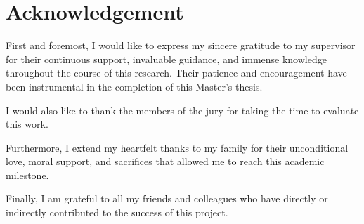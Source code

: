 \chapter*{Acknowledgement}
\vspace*{1cm}

First and foremost, I would like to express my sincere gratitude to my supervisor for their continuous support, invaluable guidance, and immense knowledge throughout the course of this research. Their patience and encouragement have been instrumental in the completion of this Master's thesis.

I would also like to thank the members of the jury for taking the time to evaluate this work.

Furthermore, I extend my heartfelt thanks to my family for their unconditional love, moral support, and sacrifices that allowed me to reach this academic milestone. 

Finally, I am grateful to all my friends and colleagues who have directly or indirectly contributed to the success of this project.
